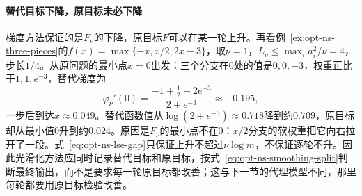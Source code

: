 \paragraph{替代目标下降，原目标未必下降}
梯度方法保证的是$F_\nu$的下降，原目标$F$可以在某一轮上升。再看例~\ref{ex:opt-ns-three-pieces}的$f(x)=\max\{-x,x/2,2x-3\}$，取$\nu=1$，$L_\nu\leq\max_ia_i^2/\nu=4$，步长$1/4$。从原问题的最小点$x=0$出发：三个分支在$0$处的值是$0,0,-3$，权重正比于$1,1,e^{-3}$，替代梯度为
\[
 \varphi_\nu'(0)=\frac{-1+\frac12+2e^{-3}}{2+e^{-3}}\approx-0.195 ,
\]
一步后到达$x\approx0.049$。替代函数值从$\log(2+e^{-3})\approx0.718$降到约$0.709$，原目标却从最小值$0$升到约$0.024$。原因是$F_\nu$的最小点不在$0$：$x/2$分支的软权重把它向右拉开了一段。式~\eqref{eq:opt-ns-lse-gap}只保证上升不超过$\nu\log m$，不保证逐轮不升。因此光滑化方法应同时记录替代目标和原目标，按式~\eqref{eq:opt-ns-smoothing-split}判断最终输出，而不是要求每一轮原目标都改善；这与下一节的代理模型不同，那里每轮都要用原目标检验改善。
